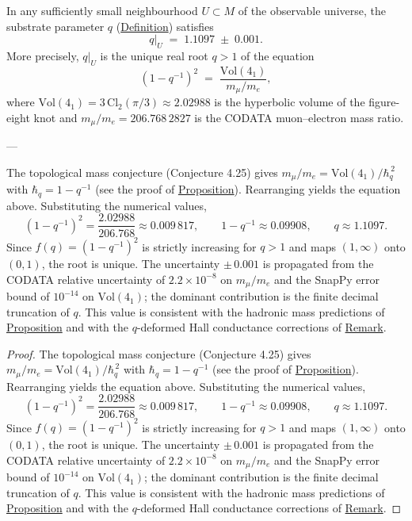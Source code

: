\begin{proposition}
  \label{prop:local-substrate-q}
In any sufficiently small neighbourhood $U \subset M$ of the observable
universe, the substrate parameter $q$
(\hyperref[def:substrate-parameter]{Definition}) satisfies
\[
q\big|_U \;=\; 1.1097 \;\pm\; 0.001.
\]
More precisely, $q|_U$ is the unique real root $q > 1$ of the equation
\[
(1 - q^{-1})^{2}
  \;=\;
  \frac{\mathrm{Vol}(4_1)}{m_\mu / m_e},
\]
where $\mathrm{Vol}(4_1) = 3\,\mathrm{Cl}_2(\pi/3) \approx 2.02988$ is the
hyperbolic volume of the figure-eight knot and $m_\mu / m_e = 206.768\,2827$
is the CODATA muon--electron mass ratio.

---

The topological mass conjecture (Conjecture 4.25) gives
$m_\mu / m_e = \mathrm{Vol}(4_1) / \hbar_q^{\,2}$ with
$\hbar_q = 1 - q^{-1}$ (see the proof of
\hyperref[prop:skein-mass-relation]{Proposition}). Rearranging yields
the equation above. Substituting the numerical values,
\[
(1 - q^{-1})^{2}
  = \frac{2.02988}{206.768}
  \approx 0.009\,817,
  \qquad
  1 - q^{-1} \approx 0.09908,
  \qquad
  q \approx 1.1097.
\]
Since $f(q) = (1 - q^{-1})^{2}$ is strictly increasing for $q > 1$ and maps
$(1,\infty)$ onto $(0,1)$, the root is unique. The uncertainty
$\pm\,0.001$ is propagated from the CODATA relative uncertainty of
$2.2 \times 10^{-8}$ on $m_\mu / m_e$ and the SnapPy error bound of
$10^{-14}$ on $\mathrm{Vol}(4_1)$; the dominant contribution is the
finite decimal truncation of $q$. This value is consistent with the
hadronic mass predictions of \hyperref[prop:terminal-resolution]{Proposition} and
with the $q$-deformed Hall conductance corrections of
\hyperref[rem:photonic-hall]{Remark}.
\end{proposition}
\begin{proof}
The topological mass conjecture (Conjecture 4.25) gives
$m_\mu / m_e = \mathrm{Vol}(4_1) / \hbar_q^{\,2}$ with
$\hbar_q = 1 - q^{-1}$ (see the proof of
\hyperref[prop:skein-mass-relation]{Proposition}). Rearranging yields
the equation above. Substituting the numerical values,
\[
(1 - q^{-1})^{2}
  = \frac{2.02988}{206.768}
  \approx 0.009\,817,
  \qquad
  1 - q^{-1} \approx 0.09908,
  \qquad
  q \approx 1.1097.
\]
Since $f(q) = (1 - q^{-1})^{2}$ is strictly increasing for $q > 1$ and maps
$(1,\infty)$ onto $(0,1)$, the root is unique. The uncertainty
$\pm\,0.001$ is propagated from the CODATA relative uncertainty of
$2.2 \times 10^{-8}$ on $m_\mu / m_e$ and the SnapPy error bound of
$10^{-14}$ on $\mathrm{Vol}(4_1)$; the dominant contribution is the
finite decimal truncation of $q$. This value is consistent with the
hadronic mass predictions of \hyperref[prop:terminal-resolution]{Proposition} and
with the $q$-deformed Hall conductance corrections of
\hyperref[rem:photonic-hall]{Remark}.
\end{proof}

